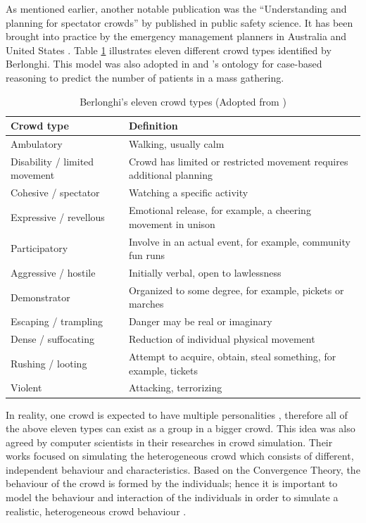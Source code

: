 As mentioned earlier, another notable publication was the ``Understanding and planning for spectator crowds'' by \textcite{Berlonghi1995} published in public safety science. It has been brought into practice by the emergency management planners in Australia \parencite{EMA1999} and United States \parencite{FEMA2005}. Table \ref{table:berlonghiCrowdType} illustrates eleven different crowd types identified by Berlonghi. This model was also adopted in \textcite{DelirHaghighi2013a} and \textcite{Arbon2007}’s ontology for case-based reasoning to predict the number of patients in a mass gathering.

\begin{table}
	\caption{Berlonghi's eleven crowd types (Adopted from \textcite{Zeitz2009})}
	\label{table:berlonghiCrowdType}
	\centering
	\begin{tabular}{|l|p{8cm}|}
		\hline
		\textbf{Crowd type} & \textbf{Definition} \\ \hline \hline
		Ambulatory & Walking, usually calm  \\ \hline
		Disability / limited movement & Crowd has limited or restricted movement requires additional planning \\ \hline
		Cohesive / spectator & Watching a specific activity \\ \hline
		Expressive / revellous & Emotional release, for example, a cheering movement in unison \\ \hline
		Participatory & Involve in an actual event, for example, community fun runs \\ \hline
		Aggressive / hostile & Initially verbal, open to lawlessness \\ \hline
		Demonstrator & Organized to some degree, for example, pickets or marches \\ \hline
		Escaping / trampling & Danger may be real or imaginary \\ \hline
		Dense / suffocating & Reduction of individual physical movement \\ \hline
		Rushing / looting & Attempt to acquire, obtain, steal something, for example, tickets \\ \hline
		Violent & Attacking, terrorizing \\ \hline
	\end{tabular}
\end{table}

In reality, one crowd is expected to have multiple personalities \parencite{Berlonghi1995}, therefore all of the above eleven types can exist as a group in a bigger crowd. This idea was also agreed by computer scientists in their researches in crowd simulation. Their works focused on simulating the heterogeneous crowd which consists of different, independent behaviour and characteristics. Based on the Convergence Theory, the behaviour of the crowd is formed by the individuals; hence it is important to model the behaviour and interaction of the individuals in order to simulate a realistic, heterogeneous crowd behaviour \parencite{Guy2011}.

